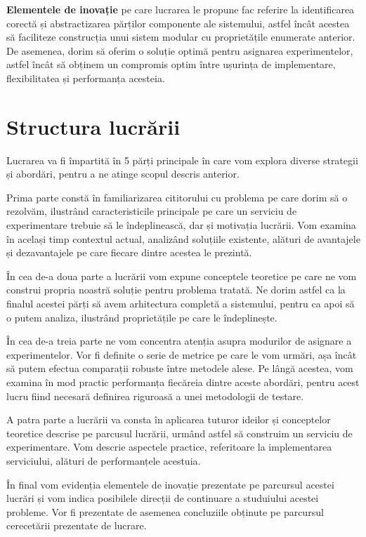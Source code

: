 \textbf{Elementele de inovație} pe care lucrarea le propune fac referire la identificarea corectă și abstractizarea părților componente ale sistemului, astfel încât acestea să faciliteze construcția unui sistem modular cu proprietățile enumerate anterior. De asemenea, dorim să oferim o soluție optimă pentru asignarea experimentelor, astfel încât să obținem un compromis optim între ușurința de implementare, flexibilitatea și  performanța acesteia.

\section{Structura lucrării}

Lucrarea va fi împartită în 5 părți principale în care vom explora diverse strategii și abordări, pentru a ne atinge scopul descris anterior. 

Prima parte constă în familiarizarea cititorului cu problema pe care dorim să o rezolvăm, ilustrând caracteristicile principale pe care un serviciu de experimentare trebuie să le îndeplinească, dar și motivația lucrării. Vom examina în același timp contextul actual, analizând soluțiile existente, alături de avantajele și dezavantajele pe care fiecare dintre acestea le prezintă.

În cea de-a doua parte a lucrării vom expune conceptele teoretice pe care ne vom construi propria noastră soluție pentru problema tratată. Ne dorim astfel ca la finalul acestei părți să avem arhitectura completă a sistemului, pentru ca apoi să o putem analiza, ilustrând proprietățile pe care le îndeplinește.

În cea de-a treia parte ne vom concentra atenția asupra modurilor de asignare a experimentelor. Vor fi definite o serie de metrice pe care le vom urmări, așa încât să putem efectua comparații robuste între metodele alese. Pe lângă acestea, vom examina în mod practic performanța fiecăreia dintre aceste abordări, pentru acest lucru fiind necesară definirea riguroasă a unei metodologii de testare.

A patra parte a lucrării va consta în aplicarea tuturor ideilor și conceptelor teoretice descrise pe parcusul lucrării, urmând astfel să construim un serviciu de experimentare. Vom descrie aspectele practice, referitoare la implementarea serviciului, alături de performanțele acestuia.

În final vom evidenția elementele de inovație prezentate pe parcursul acestei lucrări și vom indica posibilele direcții de continuare a studuiului acestei probleme. Vor fi prezentate de asemenea concluziile obținute pe parcursul cerecetării prezentate de lucrare.

